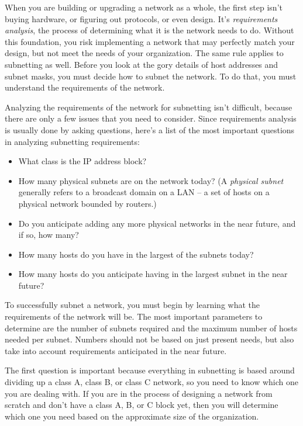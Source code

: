 When you are building or upgrading a network as a whole, the first step
isn't buying hardware, or figuring out protocols, or even design. It's
{\emph{requirements analysis}}, the process of determining what it is
the network needs to do. Without this foundation, you risk implementing
a network that may perfectly match your design, but not meet the needs
of your organization. The same rule applies to subnetting as well.
Before you look at the gory details of host addresses and subnet masks,
you must decide how to subnet the network. To do that, you must
understand the requirements of the network.

Analyzing the requirements of the network for subnetting isn't
difficult, because there are only a few issues that you need to
consider. Since requirements analysis is usually done by asking
questions, here's a list of the most important questions in analyzing
subnetting requirements:

\begin{itemize}
   \item
      What class is the IP address block?
   \item
      How many physical subnets are on the network today?
      (A \emph{physical subnet} generally refers to a broadcast domain on a LAN -- a set of hosts on a physical network bounded by routers.)
   \item
      Do you anticipate adding any more physical networks in the near future, and if so, how many?
   \item
      How many hosts do you have in the largest of the subnets today?
   \item
      How many hosts do you anticipate having in the largest subnet in the near future?
\end{itemize}


\begin{keyconcept}
To successfully subnet a network, you must begin by learning what the requirements of the network will be.
The most important parameters to determine are the number of subnets required and the maximum number of hosts needed per subnet.
Numbers should not be based on just present needs, but also take into account requirements anticipated in the near future.
\end{keyconcept}

The first question is important because everything in subnetting is
based around dividing up a class A, class B, or class C network, so you
need to know which one you are dealing with. If you are in the process
of designing a network from scratch and don't have a class A, B, or C
block yet, then you will determine which one you need based on the
approximate size of the organization.

